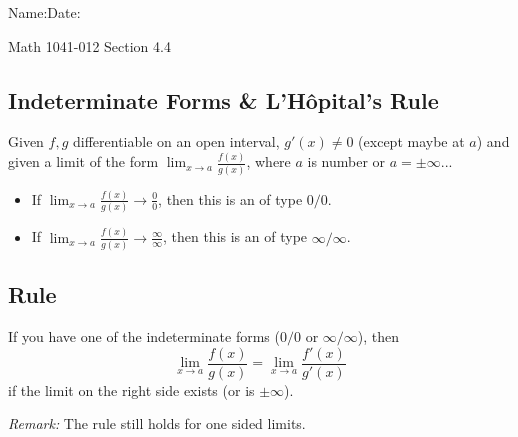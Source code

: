 \documentclass[10pt]{book}
\theoremstyle{definition}
\begin{document}
\begin{flushleft}
Name:\underline{\hspace{13cm}}Date:\underline{\hspace{2cm}}
\end{flushleft}
\begin{center}
{\Large Math 1041-012 \hspace{0.5cm} Section 4.4}
\end{center}

\begin{tcolorbox}
\subsection*{Indeterminate Forms \& L'H\^{o}pital's Rule}
Given $f,g$ differentiable on an open interval, $g'(x)\neq 0$ (except maybe at $a$) and given a limit of the form $\displaystyle\lim_{x\rightarrow a}\frac{f(x)}{g(x)}$, where $a$ is number or $a=\pm\infty$...
\begin{itemize}
    \item If $\displaystyle\lim_{x\rightarrow a}\frac{f(x)}{g(x)}\rightarrow\frac{0}{0}$, then this is an \underline{\hspace{7cm}} of type $0/0$.
    \item If $\displaystyle\lim_{x\rightarrow a}\frac{f(x)}{g(x)}\rightarrow\frac{\infty}{\infty}$, then this is an \underline{\hspace{7cm}} of type $\infty/\infty$.
\end{itemize}
\subsection*{Rule}
If you have one of the indeterminate forms ($0/0$ or $\infty/\infty$), then
\[
\lim_{x\rightarrow a}\frac{f(x)}{g(x)}=\lim_{x\rightarrow a}\frac{f'(x)}{g'(x)}
\]
if the limit on the right side exists (or is $\pm\infty$).
\end{tcolorbox}
\textit{Remark:} The rule still holds for one sided limits.\\
\end{document}
